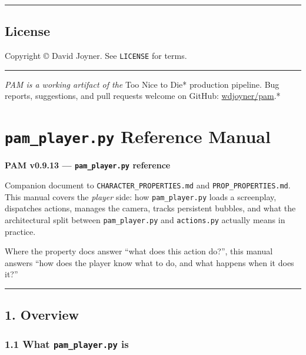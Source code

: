 \documentclass[
  11pt,
]{book}
\begin{document}
\begin{center}\rule{0.5\linewidth}{0.5pt}\end{center}

\section{License}\label{license}

Copyright © David Joyner. See \texttt{LICENSE} for terms.

\begin{center}\rule{0.5\linewidth}{0.5pt}\end{center}

\emph{PAM is a working artifact of the }Too Nice to Die* production
pipeline. Bug reports, suggestions, and pull requests welcome on GitHub:
\href{https://github.com/wdjoyner/pam}{wdjoyner/pam}.*

\chapter{\texorpdfstring{\texttt{pam\_player.py} Reference
Manual}{pam\_player.py Reference Manual}}\label{pam_player.py-reference-manual}

\textbf{PAM v0.9.13 --- \texttt{pam\_player.py} reference}

Companion document to \texttt{CHARACTER\_PROPERTIES.md} and
\texttt{PROP\_PROPERTIES.md}. This manual covers the \emph{player} side:
how \texttt{pam\_player.py} loads a screenplay, dispatches actions,
manages the camera, tracks persistent bubbles, and what the
architectural split between \texttt{pam\_player.py} and
\texttt{actions.py} actually means in practice.

Where the property docs answer ``what does this action do?'', this
manual answers ``how does the player know what to do, and what happens
when it does it?''

\begin{center}\rule{0.5\linewidth}{0.5pt}\end{center}

\section{1. Overview}\label{overview}

\subsection{\texorpdfstring{1.1 What \texttt{pam\_player.py}
is}{1.1 What pam\_player.py is}}\label{what-pam_player.py-is}
\end{document}

